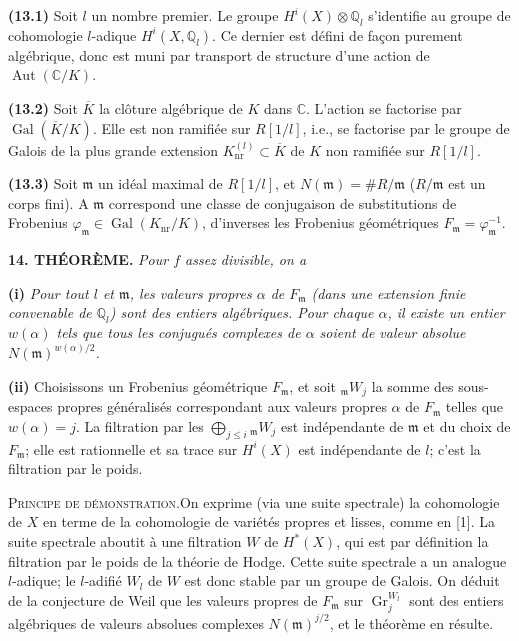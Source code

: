 \documentclass[8pt]{extarticle}
\newcommand{\DSourceFolio}{--}
\newcommand{\DAuthorityPage}{--}
\newcommand{\SourcePage}[2]{%
  \renewcommand{\DSourceFolio}{#1}%
  \renewcommand{\DAuthorityPage}{#2}%
  \thispagestyle{dpage}%
}
\newcommand{\EndSourcePage}{\clearpage}
\newcommand{\ReaderFont}{\fontsize{7.35}{8.15}\selectfont}
\newcommand{\NumPara}[1]{\par\noindent\textbf{#1}\enspace}
\newcommand{\TheoremPara}[1]{\par\noindent\textbf{#1}\enspace\itshape}
\newcommand{\EndTheorem}{\par\normalfont}
\newcommand{\ProofHeadFR}{\par\noindent\textsc{Principe de démonstration.}\enspace}
\newcommand{\Q}{\mathbb{Q}}
\newcommand{\C}{\mathbb{C}}
\newcommand{\Gr}{\operatorname{Gr}}
\newcommand{\Aut}{\operatorname{Aut}}
\newcommand{\Gal}{\operatorname{Gal}}
\begin{document}
\NumPara{(13.1)} Soit \(l\) un nombre premier. Le groupe \(H^i(X)\otimes\Q_l\) s'identifie au groupe de cohomologie \(l\)-adique \(H^i(X,\Q_l)\). Ce dernier est défini de façon purement algébrique, donc est muni par transport de structure d'une action de \(\Aut(\C/K)\).

\NumPara{(13.2)} Soit \(\overline K\) la clôture algébrique de \(K\) dans \(\C\). L'action se factorise par \(\Gal(\overline K/K)\). Elle est non ramifiée sur \(R[1/l]\), i.e., se factorise par le groupe de Galois de la plus grande extension \(K_{\mathrm{nr}}^{(l)}\subset\overline K\) de \(K\) non ramifiée sur \(R[1/l]\).

\NumPara{(13.3)} Soit \(\mathfrak m\) un idéal maximal de \(R[1/l]\), et \(N(\mathfrak m)=\#R/\mathfrak m\) (\(R/\mathfrak m\) est un corps fini). A \(\mathfrak m\) correspond une classe de conjugaison de substitutions de Frobenius \(\varphi_{\mathfrak m}\in\Gal(K_{\mathrm{nr}}/K)\), d'inverses les Frobenius géométriques \(F_{\mathfrak m}=\varphi_{\mathfrak m}^{-1}\).

\TheoremPara{14. THÉORÈME.} Pour \(f\) assez divisible, on a\EndTheorem
\EndSourcePage

\SourcePage{84}{6}
\ReaderFont
\TheoremPara{(i)} Pour tout \(l\) et \(\mathfrak m\), les valeurs propres \(\alpha\) de \(F_{\mathfrak m}\) (dans une extension finie convenable de \(\Q_l\)) sont des entiers algébriques. Pour chaque \(\alpha\), il existe un entier \(w(\alpha)\) tels que tous les conjugués complexes de \(\alpha\) soient de valeur absolue \(N(\mathfrak m)^{w(\alpha)/2}\).

\NumPara{(ii)} Choisissons un Frobenius géométrique \(F_{\mathfrak m}\), et soit \({}_{\mathfrak m}W_j\) la somme des sous-espaces propres généralisés correspondant aux valeurs propres \(\alpha\) de \(F_{\mathfrak m}\) telles que \(w(\alpha)=j\). La filtration par les \(\bigoplus_{j\le i}{}_{\mathfrak m}W_j\) est indépendante de \(\mathfrak m\) et du choix de \(F_{\mathfrak m}\); elle est rationnelle et sa trace sur \(H^i(X)\) est indépendante de \(l\); c'est la filtration par le poids.\EndTheorem

\ProofHeadFR On exprime (via une suite spectrale) la cohomologie de \(X\) en terme de la cohomologie de variétés propres et lisses, comme en [1]. La suite spectrale aboutit à une filtration \(W\) de \(H^*(X)\), qui est par définition la filtration par le poids de la théorie de Hodge. Cette suite spectrale a un analogue \(l\)-adique; le \(l\)-adifié \(W_l\) de \(W\) est donc stable par un groupe de Galois. On déduit de la conjecture de Weil que les valeurs propres de \(F_{\mathfrak m}\) sur \(\Gr_j^{W_l}\) sont des entiers algébriques de valeurs absolues complexes \(N(\mathfrak m)^{j/2}\), et le théorème en résulte.
\end{document}
